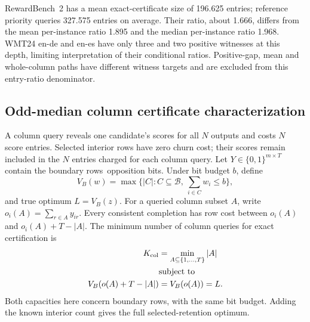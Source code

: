 RewardBench~2 has a mean exact-certificate size of 196.625 entries; reference priority queries 327.575 entries on average. Their ratio, about 1.666, differs from the mean per-instance ratio 1.895 and the median per-instance ratio 1.968. WMT24 en-de and en-es have only three and two positive witnesses at this depth, limiting interpretation of their conditional ratios. Positive-gap, mean and whole-column paths have different witness targets and are excluded from this entry-ratio denominator.



\subsection{Odd-median column certificate characterization}
\label{app:column-witness}
A column query reveals one candidate's scores for all $N$ outputs and costs $N$ score entries. Selected interior rows have zero churn cost; their scores remain included in the $N$ entries charged for each column query. Let $Y\in\{0,1\}^{m\times T}$ contain the boundary rows\textquotesingle\ opposition bits. Under bit budget $b$, define
\[
 V_B(w)=\max\Big\{|C|:C\subseteq\mathcal B,\ \sum_{i\in C}w_i\le b\Big\},
\]
and true optimum $L=V_B(z)$. For a queried column subset $A$, write $o_i(A)=\sum_{r\in A}y_{ir}$. Every consistent completion has row cost between $o_i(A)$ and $o_i(A)+T-|A|$. The minimum number of column queries for exact certification is
\begin{align*}
 K_{\rm col}&=\min_{A\subseteq\{1,\ldots,T\}}|A|\\
 &\text{subject to}\\
 V_B(o(A)+T-|A|)&=V_B(o(A))=L.
\end{align*}
Both capacities here concern boundary rows, with the same bit budget. Adding the known interior count gives the full selected-retention optimum.

